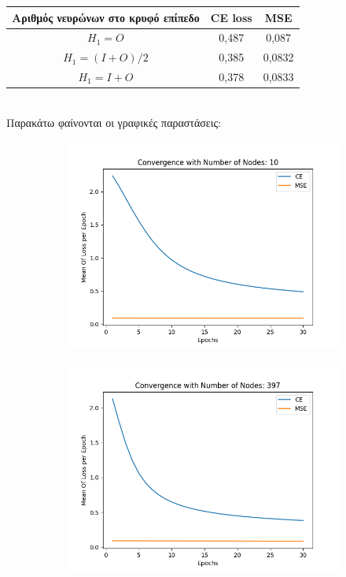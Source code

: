 \documentclass[12pt,a4paper]{article}
\newcommand{\tl}{\textlatin}
\begin{document}
\begin{enumerate}[a]
            \begin{tabular}{|c | c | c | }
                \hline
                Αριθμός νευρώνων στο κρυφό επίπεδο & \tl{CE loss} & \tl{MSE} \\
                \hline
                $H_1 = O$       & 0,487 & 0,087 \\ 
                $H_1 = (I+O)/2$ & 0,385 & 0,0832 \\ 
                $H_1 = I+O$     & 0,378 & 0,0833 \\
                \hline 
            \end{tabular} \\
            
            Παρακάτω φαίνονται οι γραφικές παραστάσεις: 
            \begin{figure}[H]
                \raggedright
                    \begin{subfigure}[t]{0.5\textwidth}
                        \includegraphics[width=10cm,height=7cm,left]{images/10.png}
                    \end{subfigure}
                    \begin{subfigure}[t]{0.5\textwidth}
                        \includegraphics[width=10cm,height=7cm,left]{images/397.png} 

\end{subfigure}
\end{figure}
\end{enumerate}
\end{document}
